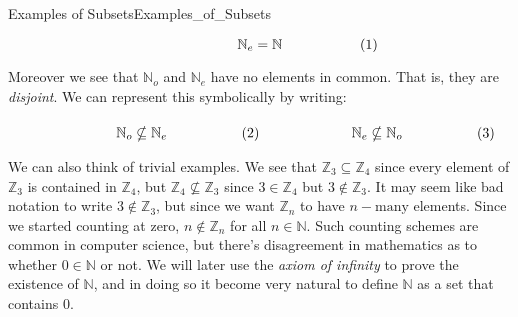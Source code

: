 \begin{lexample}{Examples of Subsets}{Examples_of_Subsets}
\begin{subequations}
\begin{minipage}[b]{0.49\textwidth}
\begin{equation}
                        \mathbb{N}_{e}=\mathbb{N}
                    \end{equation}
                \end{minipage}
            \end{subequations}
            \par\vspace{2.5ex}
            Moreover we see that $\mathbb{N}_{o}$ and $\mathbb{N}_{e}$
            have no elements in common. That is, they are
            \textit{disjoint}. We can represent this symbolically by
            writing:
            \par\hfill\par
            \begin{subequations}
                \begin{minipage}[b]{0.49\textwidth}
                    \begin{equation}
                        \mathbb{N}_{o}\nsubseteq\mathbb{N}_{e}
                    \end{equation}
                \end{minipage}
                \hfill
                \begin{minipage}[b]{0.49\textwidth}
                    \begin{equation}
                        \mathbb{N}_{e}\nsubseteq\mathbb{N}_{o}
                    \end{equation}
                \end{minipage}
            \end{subequations}
            \par\vspace{2.5ex}
            We can also think of trivial examples. We see that
            $\mathbb{Z}_{3}\subseteq\mathbb{Z}_{4}$ since every element
            of $\mathbb{Z}_{3}$ is contained in $\mathbb{Z}_{4}$, but
            $\mathbb{Z}_{4}\nsubseteq\mathbb{Z}_{3}$ since
            $3\in\mathbb{Z}_{4}$ but $3\notin\mathbb{Z}_{3}$. It may seem
            like bad notation to write $3\notin\mathbb{Z}_{3}$, but since we
            want $\mathbb{Z}_{n}$ to have $n-\textrm{many}$ elements. Since we
            started counting at zero, $n\notin\mathbb{Z}_{n}$ for all
            $n\in\mathbb{N}$. Such counting schemes are common in computer
            science, but there's disagreement in mathematics as to whether
            $0\in\mathbb{N}$ or not. We will later use the
            \textit{axiom of infinity} to prove the existence of $\mathbb{N}$,
            and in doing so it become very natural to define $\mathbb{N}$ as
            a set that contains $0$.
        \end{lexample}
